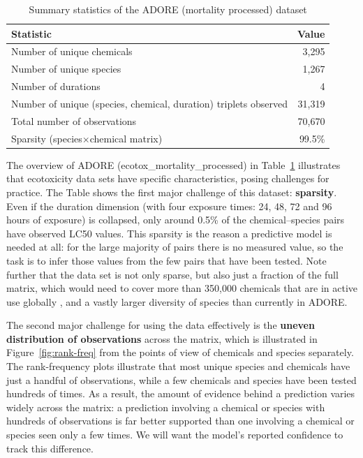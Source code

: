 \begin{table}[ht]
\centering
\caption{Summary statistics of the ADORE (mortality processed) dataset}
\label{tab:adore_summary}
\begin{tabular}{l r}
\hline
\textbf{Statistic} & \textbf{Value} \\
\hline
Number of unique chemicals & 3,295 \\
Number of unique species & 1,267 \\
Number of durations & 4 \\
Number of unique (species, chemical, duration) triplets observed & 31,319 \\
Total number of observations & 70,670 \\
Sparsity (species$\times$chemical matrix) & 99.5\% \\
\hline
\end{tabular}
\end{table}

The overview of ADORE (ecotox\_mortality\_processed) in Table~\ref{tab:adore_summary} illustrates that ecotoxicity data sets have specific characteristics, posing challenges for practice. The Table shows the first major challenge of this dataset: \textbf{sparsity}. Even if the duration dimension (with four exposure times: 24, 48, 72 and 96 hours of exposure) is collapsed, only around 0.5\% of the chemical--species pairs have observed LC50 values. This sparsity is the reason a predictive model is needed at all: for the large majority of pairs there is no measured value, so the task is to infer those values from the few pairs that have been tested. Note further that the data set is not only sparse, but also just a fraction of the full matrix, which would need to cover more than 350,000 chemicals that are in active use globally \cite{wang2020toward}, and a vastly larger diversity of species than currently in ADORE.

The second major challenge for using the data effectively is the \textbf{uneven distribution of observations} across the matrix, which is illustrated in Figure~\ref{fig:rank-freq} from the points of view of chemicals and species separately. The rank-frequency plots illustrate that most unique species and chemicals have just a handful of observations, while a few chemicals and species have been tested hundreds of times. As a result, the amount of evidence behind a prediction varies widely across the matrix: a prediction involving a chemical or species with hundreds of observations is far better supported than one involving a chemical or species seen only a few times. We will want the model's reported confidence to track this difference.

